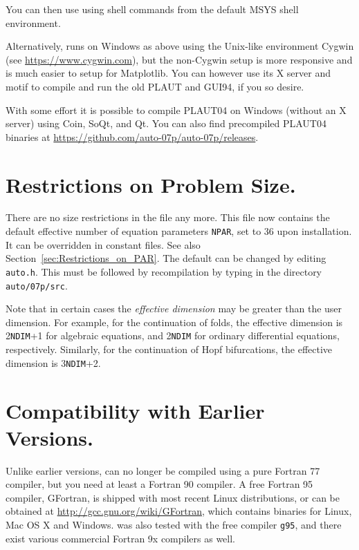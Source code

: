 \documentclass[12pt]{report}
\begin{document}
You can then use \AUTO using shell commands from the default MSYS shell
environment.

Alternatively, \AUTO runs on Windows as above using the Unix-like
environment Cygwin (see \url{https://www.cygwin.com}), but the
non-Cygwin setup is more responsive and is much easier to setup for
Matplotlib. You can however use its X server and motif to compile
and run the old {\cal PLAUT} and GUI94, if you so desire.

With some effort it is possible to compile {\cal PLAUT04}
on Windows (without an X server) using Coin, SoQt, and Qt. You can
also find precompiled {\cal PLAUT04} binaries at
\url{https://github.com/auto-07p/auto-07p/releases}.

\section{ Restrictions on Problem Size.} \label{sec:Restrictions}
There are no size restrictions in the file  any more. This file now contains the
default effective number of equation parameters {\tt NPAR}, set to 36
upon installation. It can be overridden in constant files.
See also Section~\ref{sec:Restrictions_on_PAR}.
The default can be changed by editing {\tt auto.h}.
This must be followed by recompilation by typing  
in the directory {\tt auto/07p/src}.

Note that in certain cases the {\it effective dimension} may be greater
than the user dimension.
For example, for the continuation of folds,
the effective dimension is 2{\tt NDIM}+1 for algebraic equations,
and 2{\tt NDIM} for ordinary differential equations, respectively.
Similarly, for the continuation of Hopf bifurcations,
the effective dimension is 3{\tt NDIM}+2.
 
 
\section{ Compatibility with Earlier Versions.} \label{sec:Compatibility}
Unlike earlier versions, \AUTO can no longer be compiled using a pure
Fortran 77 compiler, but you need at least a Fortran 90 compiler.
A free Fortran 95 compiler, GFortran, is shipped with most recent
Linux distributions, or can be obtained at
\url{http://gcc.gnu.org/wiki/GFortran}, which contains binaries for
Linux, Mac OS X and Windows. \AUTO was also tested with the free
compiler {\tt g95}, and there exist various commercial Fortran
9x compilers as well.
\end{document}
